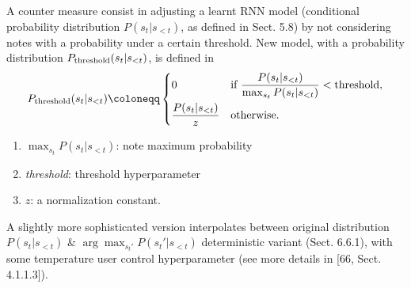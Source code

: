 \documentclass{article}
\begin{document}
\begin{itemize}
\begin{itemize}
\begin{itemize}
\begin{itemize}
				A counter measure consist in adjusting a learnt RNN model (conditional probability distribution $P(s_t|s_{< t})$, as defined in Sect. 5.8) by not considering notes with a probability under a certain threshold. New model, with a probability distribution $P_{\rm threshold}(s_t|s_{< t})$, is defined in
				\begin{equation*}
					P_{\rm threshold}(s_t|s_{< t})\coloneqq\left\{\begin{split}
						&0&&\mbox{if }\frac{P(s_t|s_{< t})}{\max_{s_t} P(s_t|s_{< t})} < {\rm threshold},\\
						&\frac{P(s_t|s_{< t})}{z}&&\mbox{otherwise}.
					\end{split}\right.
				\end{equation*}
				\begin{enumerate}
					\item $\max_{s_t} P(s_t|s_{< t})$: note maximum probability
					\item {\it threshold}: threshold hyperparameter
					\item $z$: a normalization constant.
				\end{enumerate}
				A slightly more sophisticated version interpolates between original distribution $P(s_t|s_{<t})$ \& $\arg\max_{s_t'} P(s_t'|s_{<t})$ deterministic variant (Sect. 6.6.1), with some temperature user control hyperparameter (see more details in [66, Sect. 4.1.1.3]).
				

\end{itemize}
\end{itemize}
\end{itemize}
\end{itemize}
\end{document}
